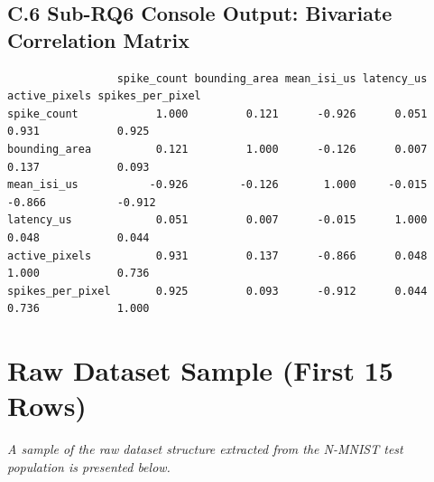 \section{C.6 Sub-RQ6 Console Output: Bivariate Correlation Matrix}
\begin{verbatim}
                 spike_count bounding_area mean_isi_us latency_us active_pixels spikes_per_pixel
spike_count            1.000         0.121      -0.926      0.051         0.931            0.925
bounding_area          0.121         1.000      -0.126      0.007         0.137            0.093
mean_isi_us           -0.926        -0.126       1.000     -0.015        -0.866           -0.912
latency_us             0.051         0.007      -0.015      1.000         0.048            0.044
active_pixels          0.931         0.137      -0.866      0.048         1.000            0.736
spikes_per_pixel       0.925         0.093      -0.912      0.044         0.736            1.000
\end{verbatim}

\newpage

\chapter{Raw Dataset Sample (First 15 Rows)}
\label{app:csv_sample}

\textit{A sample of the raw dataset structure extracted from the N-MNIST test population is presented below.}

\begin{table}[htbp]
\centering
\caption{First 15 Rows of `nmnist\_features.csv`}
\label{tab:csv_sample_table}
\end{table}

